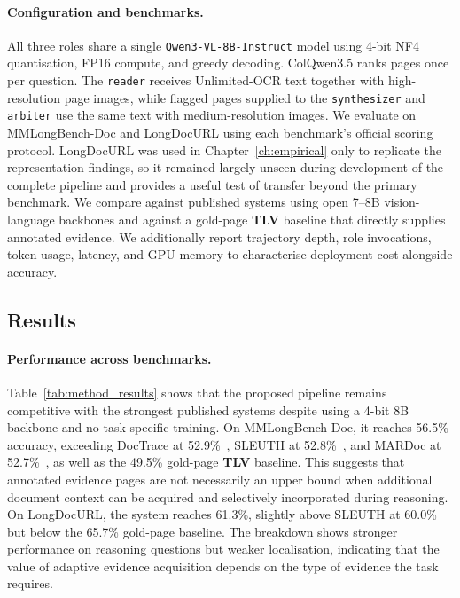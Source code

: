 \documentclass[11pt,twoside,openany]{report}
\begin{document}
\paragraph{Configuration and benchmarks.}
All three roles share a single \texttt{Qwen3-VL-8B-Instruct} model using 4-bit NF4 quantisation, FP16 compute, and greedy decoding. ColQwen3.5 ranks pages once per question. The \texttt{reader} receives Unlimited-OCR text together with high-resolution page images, while flagged pages supplied to the \texttt{synthesizer} and \texttt{arbiter} use the same text with medium-resolution images. We evaluate on MMLongBench-Doc and LongDocURL using each benchmark's official scoring protocol. LongDocURL was used in Chapter~\ref{ch:empirical} only to replicate the representation findings, so it remained largely unseen during development of the complete pipeline and provides a useful test of transfer beyond the primary benchmark. We compare against published systems using open 7--8B vision-language backbones and against a gold-page \textbf{TLV} baseline that directly supplies annotated evidence. We additionally report trajectory depth, role invocations, token usage, latency, and GPU memory to characterise deployment cost alongside accuracy.

\subsection{Results}
\label{sec:simple_method_results}



\paragraph{Performance across benchmarks.}
Table~\ref{tab:method_results} shows that the proposed pipeline remains competitive with the strongest published systems despite using a 4-bit 8B backbone and no task-specific training. On MMLongBench-Doc, it reaches 56.5\% accuracy, exceeding DocTrace at 52.9\%~\citep{xiang2026doctrace}, SLEUTH at 52.8\%~\citep{liu2025resolving}, and MARDoc at 52.7\%~\citep{chen2026mardoc}, as well as the 49.5\% gold-page \textbf{TLV} baseline. This suggests that annotated evidence pages are not necessarily an upper bound when additional document context can be acquired and selectively incorporated during reasoning. On LongDocURL, the system reaches 61.3\%, slightly above SLEUTH at 60.0\% but below the 65.7\% gold-page baseline. The breakdown shows stronger performance on reasoning questions but weaker localisation, indicating that the value of adaptive evidence acquisition depends on the type of evidence the task requires.
\end{document}
